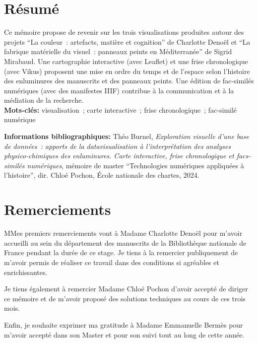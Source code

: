 \documentclass[a4paper,12pt,twoside]{book}
\begin{document}
	\chapter{Résumé}
	\medskip
	Ce mémoire propose de revenir sur les trois visualisations produites autour des projets \enquote{La couleur~: artefacts, matière et cognition} de Charlotte Denoël et \enquote{La fabrique matérielle du visuel~: panneaux peints en Méditerranée} de Sigrid Mirabaud. Une cartographie interactive (avec Leaflet) et une frise chronologique (avec Vikus) proposent une mise en ordre du temps et de l’espace selon l’histoire des enluminures des manuscrits et des panneaux peints. Une édition de fac-similés numériques (avec des manifestes IIIF) contribue à la communication et à la médiation de la recherche.	\\
	
	\textbf{Mots-clés:} visualisation~; carte interactive~; frise chronologique~; fac-similé numérique
	
	\textbf{Informations bibliographiques:} Théo Burnel, \textit{Exploration visuelle d'une base de données~: apports de la datavisualisation à l’interprétation des analyses physico-chimiques des enluminures. Carte interactive, frise chronologique et facs-similés numériques}, mémoire de master \enquote{Technologies numériques appliquées à l'histoire}, dir. Chloé Pochon, École nationale des chartes, 2024.
	
	\newpage{\pagestyle{empty}\cleardoublepage}
	
	\chapter{Remerciements}
	\lettrine{M}Mes premiers remerciements vont à Madame Charlotte Denoël pour m'avoir accueilli au sein du département des manuscrits de la Bibliothèque nationale de France pendant la durée de ce stage. Je tiens à la remercier publiquement de m'avoir permis de réaliser ce travail dans des conditions si agréables et enrichissantes.\par
	Je tiens également à remercier Madame Chloé Pochon d'avoir accepté de diriger ce mémoire et de m'avoir proposé des solutions techniques au cours de ces trois mois.\par
	Enfin, je souhaite exprimer ma gratitude à Madame Emmanuelle Bermès pour m'avoir accepté dans son Master et pour son suivi tout au long de cette année.
	\newpage{\pagestyle{empty}\cleardoublepage}
	
	\printbibliography
	\newpage{\pagestyle{empty}\cleardoublepage}
	
\end{document}
